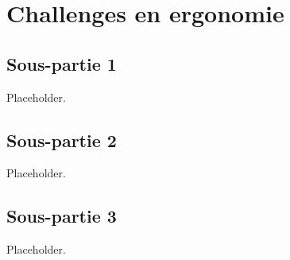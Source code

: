 \section{Challenges en ergonomie}

\subsection{Sous-partie 1}

Placeholder.

\subsection{Sous-partie 2}

Placeholder.

\subsection{Sous-partie 3}

Placeholder.